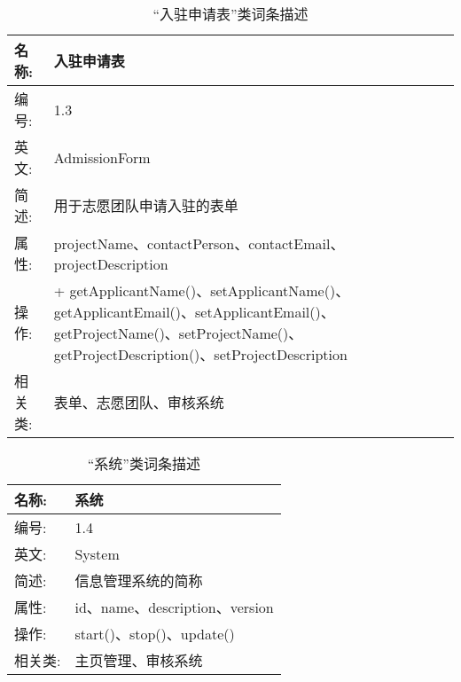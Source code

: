 \begin{table}[H]  
\caption{“入驻申请表”类词条描述}  
\begin{center}  
    \begin{tabular}{l p{11cm}} 
        \hline
        \quad 名称:  &  入驻申请表 \\
        \hline
        \quad 编号:  & 1.3 \\
        \hline
        \quad 英文:  &  AdmissionForm \\
        \hline
        \quad 简述:  & 用于志愿团队申请入驻的表单 \\
        \hline
        \quad 属性:  & projectName、contactPerson、contactEmail、projectDescription\\
        \hline
        \quad 操作:  & + getApplicantName()、setApplicantName()、getApplicantEmail()、setApplicantEmail()、getProjectName()、setProjectName()、getProjectDescription()、setProjectDescription
\\
        \hline
        \quad 相关类:  & 表单、志愿团队、审核系统 \\
        \hline
    \end{tabular}
\end{center}
\end{table}

\begin{table}[H]  
\caption{“系统”类词条描述}  
\begin{center}  
    \begin{tabular}{l p{11cm}} 
        \hline
        \quad 名称:  &  系统 \\
        \hline
        \quad 编号:  & 1.4 \\
        \hline
        \quad 英文:  &  System \\
        \hline
        \quad 简述:  & 信息管理系统的简称 \\
        \hline
        \quad 属性:  & id、name、description、version\\
        \hline
        \quad 操作:  & start()、stop()、update()\\
        \hline
        \quad 相关类:  & 主页管理、审核系统 \\
        \hline
    \end{tabular}
\end{center}
\end{table}

